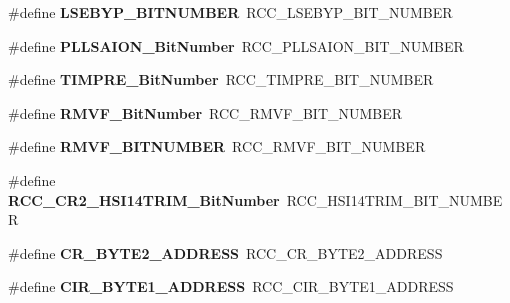 \begin{DoxyCompactItemize}
\#define {\bfseries L\+S\+E\+B\+Y\+P\+\_\+\+B\+I\+T\+N\+U\+M\+B\+ER}~R\+C\+C\+\_\+\+L\+S\+E\+B\+Y\+P\+\_\+\+B\+I\+T\+\_\+\+N\+U\+M\+B\+ER
\item 
\mbox{\label{group___h_a_l___r_c_c___aliased_ga786a15b370532d6429e03a9f9d226be7}} 
\#define {\bfseries P\+L\+L\+S\+A\+I\+O\+N\+\_\+\+Bit\+Number}~R\+C\+C\+\_\+\+P\+L\+L\+S\+A\+I\+O\+N\+\_\+\+B\+I\+T\+\_\+\+N\+U\+M\+B\+ER
\item 
\mbox{\label{group___h_a_l___r_c_c___aliased_ga3e4d33566ef60a5220ce491e74a34478}} 
\#define {\bfseries T\+I\+M\+P\+R\+E\+\_\+\+Bit\+Number}~R\+C\+C\+\_\+\+T\+I\+M\+P\+R\+E\+\_\+\+B\+I\+T\+\_\+\+N\+U\+M\+B\+ER
\item 
\mbox{\label{group___h_a_l___r_c_c___aliased_ga3a0580593374569f2663f1432812f8fe}} 
\#define {\bfseries R\+M\+V\+F\+\_\+\+Bit\+Number}~R\+C\+C\+\_\+\+R\+M\+V\+F\+\_\+\+B\+I\+T\+\_\+\+N\+U\+M\+B\+ER
\item 
\mbox{\label{group___h_a_l___r_c_c___aliased_gad4cc72917b15affc54b4d28e6529634c}} 
\#define {\bfseries R\+M\+V\+F\+\_\+\+B\+I\+T\+N\+U\+M\+B\+ER}~R\+C\+C\+\_\+\+R\+M\+V\+F\+\_\+\+B\+I\+T\+\_\+\+N\+U\+M\+B\+ER
\item 
\mbox{\label{group___h_a_l___r_c_c___aliased_ga407a7f1f6db8025f2e21fbde11d65176}} 
\#define {\bfseries R\+C\+C\+\_\+\+C\+R2\+\_\+\+H\+S\+I14\+T\+R\+I\+M\+\_\+\+Bit\+Number}~R\+C\+C\+\_\+\+H\+S\+I14\+T\+R\+I\+M\+\_\+\+B\+I\+T\+\_\+\+N\+U\+M\+B\+ER
\item 
\mbox{\label{group___h_a_l___r_c_c___aliased_ga0193aa09fc91ebd9a119c8d98e6184a9}} 
\#define {\bfseries C\+R\+\_\+\+B\+Y\+T\+E2\+\_\+\+A\+D\+D\+R\+E\+SS}~R\+C\+C\+\_\+\+C\+R\+\_\+\+B\+Y\+T\+E2\+\_\+\+A\+D\+D\+R\+E\+SS
\item 
\mbox{\label{group___h_a_l___r_c_c___aliased_ga159aa247b8dc96a030bcb9b43ece4256}} 
\#define {\bfseries C\+I\+R\+\_\+\+B\+Y\+T\+E1\+\_\+\+A\+D\+D\+R\+E\+SS}~R\+C\+C\+\_\+\+C\+I\+R\+\_\+\+B\+Y\+T\+E1\+\_\+\+A\+D\+D\+R\+E\+SS
\item 
\mbox{\label{group___h_a_l___r_c_c___aliased_gaab58c3f3f81bf1ab9a14cf3fececd8c4}} 

\end{DoxyCompactItemize}
